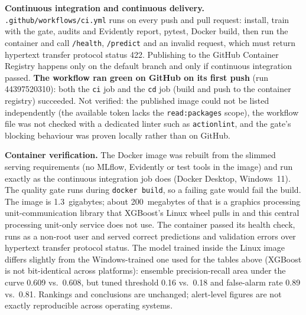 \documentclass[11pt,a4paper]{article}
\newcommand{\code}[1]{\texttt{#1}}
\begin{document}
\textbf{Continuous integration and continuous delivery.} \code{.github/workflows/ci.yml} runs on every push and pull request: install, train with the gate, audits and Evidently report, pytest, Docker build, then run the container and call
\code{/health}, \code{/predict} and an invalid request, which must return hypertext transfer protocol status 422. Publishing to the GitHub Container Registry happens only on the default branch and only if continuous integration passed.
\textbf{The workflow ran green on GitHub on its first push} (run 44397520310): both the \code{ci} job and the \code{cd} job (build and push to the container registry) succeeded.
Not verified: the published image could not be listed independently (the available token lacks the \code{read:packages} scope), the workflow file was not checked with a dedicated linter such as \code{actionlint}, and the gate's blocking behaviour was proven locally rather than on GitHub.

\textbf{Container verification.} The Docker image was rebuilt from the slimmed serving requirements (no MLflow, Evidently or test tools in the image) and run exactly as the continuous integration job does (Docker Desktop, Windows~11).
The quality gate runs during \code{docker build}, so a failing gate would fail the build. The image is 1.3~gigabytes; about 200~megabytes of that is a graphics processing unit-communication library that XGBoost's Linux wheel pulls in and this central processing unit-only service does not use.
The container passed its health check, runs as a non-root user and served
correct predictions and validation errors over hypertext transfer protocol status. The model trained inside the Linux image differs slightly from the Windows-trained one used for the tables above (XGBoost is not bit-identical across
platforms): ensemble precision-recall area under the curve 0.609 vs.\ 0.608, but tuned threshold 0.16 vs.\ 0.18 and false-alarm rate 0.89 vs.\ 0.81. Rankings and conclusions are unchanged; alert-level figures are not exactly reproducible across operating systems.

\end{document}
